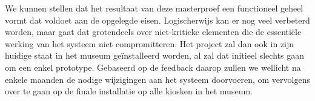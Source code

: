 We kunnen stellen dat het resultaat van deze masterproef een functioneel geheel vormt dat voldoet aan de opgelegde eisen. Logischerwijs kan er nog veel verbeterd worden, maar gaat dat grotendeels over niet-kritieke elementen die de essentiële werking van het systeem niet compromitteren. Het project zal dan ook in zijn huidige staat in het museum geïnstalleerd worden, al zal dat initieel slechts gaan om een enkel prototype. Gebaseerd op de feedback daarop zullen we wellicht na enkele maanden de nodige wijzigingen aan het systeem doorvoeren, om vervolgens over te gaan op de finale installatie op alle kiosken in het museum.

\clearpage


%
%

\listoffigures

\clearpage


%
%

\renewcommand{\lstlistlistingname}{Lijst van fragmenten}
\renewcommand{\lstlistingname}{Fragment}
\lstlistoflistings

\clearpage


%
%



